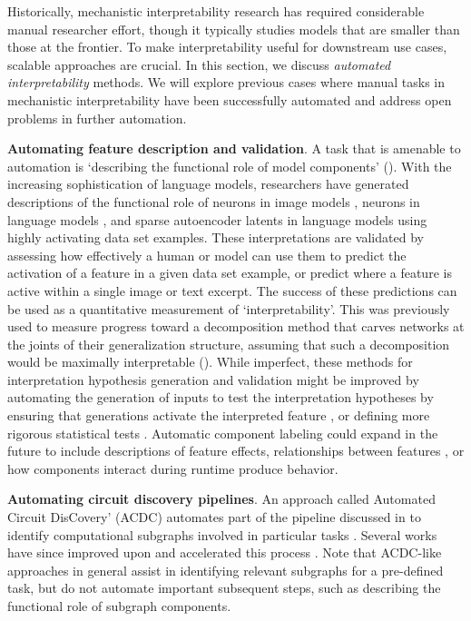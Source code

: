 Historically, mechanistic interpretability research has required considerable manual researcher effort, though it typically studies models that are smaller than those at the frontier. To make interpretability useful for downstream use cases, scalable approaches are crucial. In this section, we discuss \textit{automated interpretability} methods. We will explore previous cases where manual tasks in mechanistic interpretability have been successfully automated and address open problems in further automation.

\textbf{Automating feature description and validation}. A task that is amenable to automation is `describing the functional role of model components' (). With the increasing sophistication of language models, researchers have generated descriptions of the functional role of neurons in image models \citep{hernandez2022natural}, neurons in language models \citep{bills2023language}, and sparse autoencoder latents in language models \citep{cunningham2023sparseautoencodershighlyinterpretable,Bricken_2023_dictionary, Belrose_2024_autointerp} using highly activating data set examples. These interpretations are validated by assessing how effectively a human or model can use them to predict the activation of a feature in a given data set example, or predict where a feature is active within a single image or text excerpt. The success of these predictions can be used as a quantitative measurement of `interpretability'. This was previously used to measure progress toward a decomposition method that carves networks at the joints of their generalization structure, assuming that such a decomposition would be maximally interpretable (). While imperfect, these methods for interpretation hypothesis generation and validation might be improved by automating the generation of inputs to test the interpretation hypotheses by ensuring that generations activate the interpreted feature \citep{huang2023rigorouslyassessingnaturallanguage}, or defining more rigorous statistical tests \citep{bloom2024understanding}. Automatic component labeling could expand in the future to include descriptions of feature effects, relationships between features \citep{bussman2024metasaes}, or how components interact during runtime produce behavior.

\textbf{Automating circuit discovery pipelines}. An approach called Automated Circuit DisCovery' (ACDC) automates part of the pipeline discussed in  to identify computational subgraphs involved in particular tasks \citep{conmy2023automatedcircuitdiscoverymechanistic}. Several works have since improved upon and accelerated this process \citep{syed2023attributionpatchingoutperformsautomated,kramár2024atpefficientscalablemethod, marks2024sparsefeaturecircuitsdiscovering}. Note that ACDC-like approaches in general assist in identifying relevant subgraphs for a pre-defined task, but do not automate important subsequent steps, such as describing the functional role of subgraph components.

